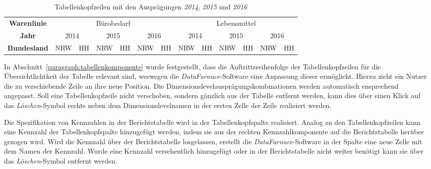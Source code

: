 \documentclass[
  language=german, %
  type=bachelor,%
  ngerman
]{isthesis}
\begin{document}
\begin{content}
    \begin{table}
      \footnotesize
      \begin{tabular}{c c c c c c c c c c c c c}
        \textbf{Warenlinie} & \multicolumn{6}{c}{Bürobedarf} & \multicolumn{6}{c}{Lebensmittel} \\
            \cmidrule(lr){2-7}\cmidrule(lr){8-13}
        \textbf{Jahr} & \multicolumn{2}{c}{2014} & \multicolumn{2}{c}{2015} & \multicolumn{2}{c}{2016} & \multicolumn{2}{c}{2014} & \multicolumn{2}{c}{2015} & \multicolumn{2}{c}{2016}\\
            \cmidrule(lr){2-3}\cmidrule(lr){4-5}\cmidrule(lr){6-7}\cmidrule(lr){8-9}\cmidrule(lr){10-11}\cmidrule(lr){12-13}
        \textbf{Bundesland} & NRW & HH & NRW & HH & NRW & HH & NRW & HH & NRW & HH & NRW & HH \\
      \end{tabular}
      \caption{Tabellenkopfzeilen mit den Ausprägungen \textit{2014}, \textit{2015} und \textit{2016}}\label{table:berichtstabellenkopf201420152016}
    \end{table}

  In Abschnitt~\ref{paragraph:tabellenkomponente} wurde festgestellt, dass die
  Auftrittsreihenfolge der Tabellenkopfzeilen für die Übersichtlichtkeit der
  Tabelle relevant sind, weswegen die \textit{DataFurnace}-Software eine Anpassung
  dieser ermöglicht. Hierzu zieht ein Nutzer die zu
  verschiebende Zeile an ihre neue Position. Die
  Dimensionslevelausprägungskombinationen werden automatisch ensprechend
  angepasst. Soll eine Tabellenkopfzeile nicht verschoben, sondern gänzlich aus
  der Tabelle entfernt werden, kann dies über einen Klick auf das
  \textit{Löschen}-Symbol rechts neben dem Dimensionslevelnamen in der ersten
  Zelle der Zeile realisiert werden.

  Die Spezifikation von Kennzahlen in der Berichtstabelle wird in der
  Tabellenkopfspalte realisiert. Analog zu den Tabellenkopfzeilen kann eine
  Kennzahl der Tabellenkopfspalte hinzugefügt werden, indem sie aus der rechten
  Kennzahlkomponente auf die Berichtstabelle herüber gezogen wird. Wird die
  Kennzahl über der Berichtstabelle losgelassen, erstellt die
  \textit{DataFurnace}-Software in der Spalte eine neue Zelle mit dem Namen der
  Kennzahl. Wurde eine Kennzahl versehentlich hinzugefügt oder in der
  Berichtstabelle nicht weiter benötigt kann sie über das
  \textit{Löschen}-Symbol entfernt werden.


\end{content}
\end{document}
